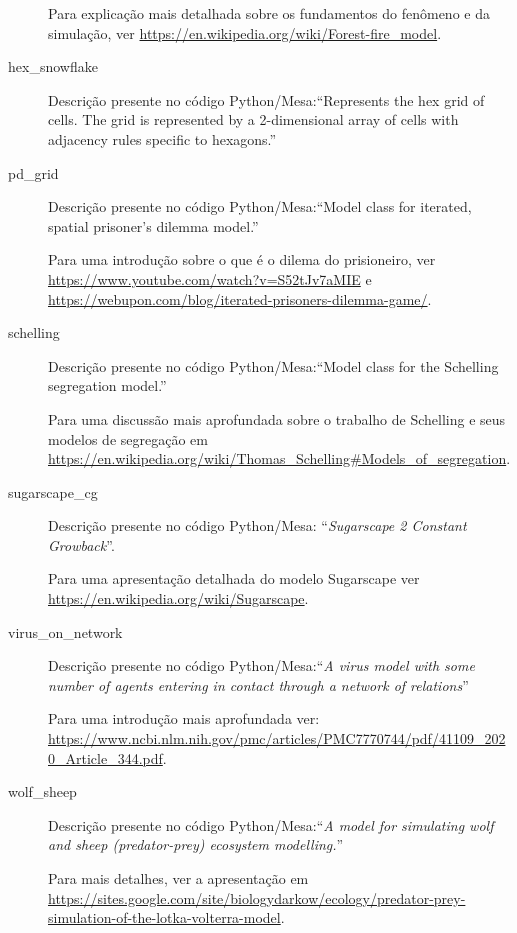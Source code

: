 \begin{description}
Para explicação mais detalhada sobre os fundamentos do fenômeno e da simulação, ver \url{https://en.wikipedia.org/wiki/Forest-fire_model}.

\item [hex\_snowflake] 

Descrição presente no código Python/Mesa:``Represents the hex grid of cells. The grid is represented by a 2-dimensional array of cells with adjacency rules specific to hexagons.''

\item [pd\_grid] 

Descrição presente no código Python/Mesa:``Model class for iterated, spatial prisoner's dilemma model.''

Para uma introdução sobre o que é o dilema do prisioneiro, ver \url{https://www.youtube.com/watch?v=S52tJv7aMIE} e \url{https://webupon.com/blog/iterated-prisoners-dilemma-game/}.

\item [schelling] 

Descrição presente no código Python/Mesa:``Model class for the Schelling segregation model.''

Para uma discussão mais aprofundada sobre o trabalho de Schelling e seus modelos de segregação em \url{https://en.wikipedia.org/wiki/Thomas_Schelling#Models_of_segregation}.

\item [sugarscape\_cg] 

Descrição presente no código Python/Mesa: ``\textit{Sugarscape 2 Constant Growback}''.

Para uma apresentação detalhada do modelo Sugarscape ver \url{https://en.wikipedia.org/wiki/Sugarscape}.


\item [virus\_on\_network] 

Descrição presente no código Python/Mesa:``\textit{A virus model with some number of agents entering in contact through a network of relations}''

Para uma introdução mais aprofundada ver: \url{https://www.ncbi.nlm.nih.gov/pmc/articles/PMC7770744/pdf/41109_2020_Article_344.pdf}.

\item [wolf\_sheep] 

Descrição presente no código Python/Mesa:``\textit{A model for simulating wolf and sheep (predator-prey) ecosystem modelling.}''

Para mais detalhes, ver a apresentação em \url{https://sites.google.com/site/biologydarkow/ecology/predator-prey-simulation-of-the-lotka-volterra-model}.

\end{description}

